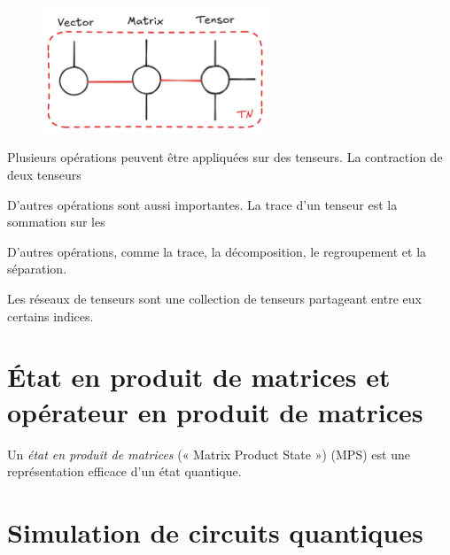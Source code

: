 \begin{figure}[ht!]
    \centering
    \includegraphics[width=0.6\textwidth]{figures/tensor.png}
    \caption{}
    \label{fig:tensor}
\end{figure}


Plusieurs opérations peuvent être appliquées sur des tenseurs. La contraction de deux tenseurs 

D'autres opérations sont aussi importantes. La trace d'un tenseur est la sommation sur les

D'autres opérations, comme la trace, la décomposition, le regroupement et la séparation.

Les réseaux de tenseurs sont une collection de tenseurs partageant entre eux certains indices.





\section{État en produit de matrices et opérateur en produit de matrices}

Un \textit{état en produit de matrices} (« Matrix Product State ») (MPS) est une représentation efficace d'un état quantique.





\section{Simulation de circuits quantiques}

